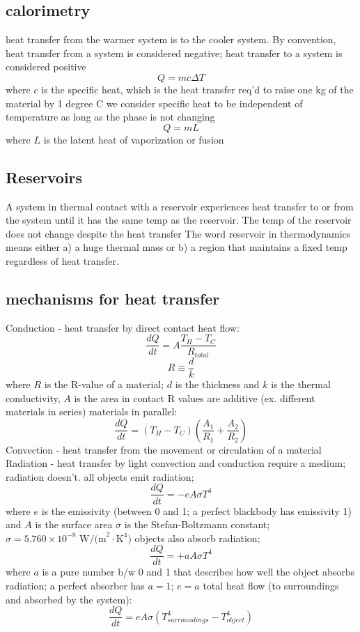 \documentclass[twocolumn]{article}
\begin{document}
\subsection{calorimetry}
\begin{outline}
\1 heat transfer from the warmer system is to the cooler system. By convention, heat transfer from a system is considered negative; heat transfer to a system is considered positive
\0 \[Q=mc\Delta T\]
\1 where $c$ is the specific heat, which is the heat transfer req'd to raise one kg of the material by 1 degree C
\1 we consider specific heat to be independent of temperature as long as the phase is not changing
\0 \[Q=mL\]
\1 where $L$ is the latent heat of vaporization or fusion
\end{outline}
\subsection{Reservoirs}
\begin{outline}
\1 A system in thermal contact with a reservoir experiences heat transfer to or from the system until it has the same temp as the reservoir. The temp of the reservoir does not change despite the heat transfer
\1 The word reservoir in thermodynamics means either a) a huge thermal mass or b) a region that maintains a fixed temp regardless of heat transfer. 
\end{outline}
\subsection{mechanisms for heat transfer}
\begin{outline}
\1 Conduction - heat transfer by direct contact
\1 heat flow: \[\dfrac{dQ}{dt}=A\dfrac{T_H-T_C}{R_{total}}\] \[R\equiv \dfrac{d}{k}\]
\1 where $R$ is the R-value of a material; $d$ is the thickness and $k$ is the thermal conductivity, $A$ is the area in contact
\1 R values are additive (ex. different materials in series)
\1 materials in parallel: \[\dfrac{dQ}{dt}=(T_H-T_C)\left(\dfrac{A_1}{R_1}+\dfrac{A_2}{R_2}\right)\]
\1 Convection - heat transfer from the movement or circulation of a material
\1 Radiation - heat transfer by light
\1 convection and conduction require a medium; radiation doesn't. 
\1 all objects emit radiation; \[\dfrac{dQ}{dt}=-eA\sigma T^4\] where $e$ is the emissivity (between 0 and 1; a perfect blackbody has emissivity 1) and $A$ is the surface area
\1 $\sigma$ is the Stefan-Boltzmann constant; \(\sigma=5.760\times10^{-8}\text{ W/(m}^2\cdot\text{K}^4\text{)}\)
\1 objects also absorb radiation; \[\dfrac{dQ}{dt}=+aA\sigma T^4\] where $a$ is a pure number b/w 0 and 1 that describes how well the object absorbs radiation; a perfect absorber has $a=1$; $e=a$
\1 total heat flow (to surroundings and absorbed by the system): \[\dfrac{dQ}{dt}=eA\sigma\left(T^4_{surroundings}-T^4_{object}\right)\]
\end{outline}
\end{document}
